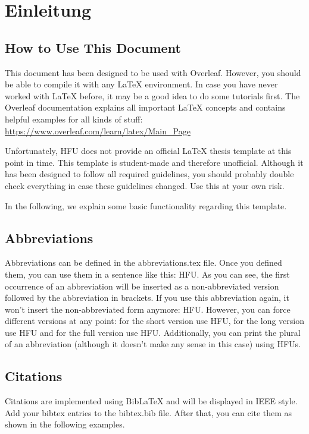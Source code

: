 \chapter{Einleitung}

\section{How to Use This Document}
This document has been designed to be used with Overleaf. However, you should be able to compile it with any LaTeX environment. In case you have never worked with LaTeX before, it may be a good idea to do some tutorials first. The Overleaf documentation explains all important LaTeX concepts and contains helpful examples for all kinds of stuff: \url{https://www.overleaf.com/learn/latex/Main_Page}\par

Unfortunately, \acl{HFU} does not provide an official LaTeX thesis template at this point in time. This template is student-made and therefore unofficial. Although it has been designed to follow all required guidelines, you should probably double check everything in case these guidelines changed. Use this at your own risk.\par

In the following, we explain some basic functionality regarding this template.

\section{Abbreviations}
Abbreviations can be defined in the abbreviations.tex file. Once you defined them, you can use them in a sentence like this: \ac{HFU}. As you can see, the first occurrence of an abbreviation will be inserted as a non-abbreviated version followed by the abbreviation in brackets. If you use this abbreviation again, it won't insert the non-abbreviated form anymore: \ac{HFU}. However, you can force different versions at any point: for the short version use \acs{HFU}, for the long version use \acl{HFU} and for the full version use \acf{HFU}. Additionally, you can print the plural of an abbreviation (although it doesn't make any sense in this case) using \acsp{HFU}. 

\section{Citations}
Citations are implemented using BibLaTeX and will be displayed in IEEE style. Add your bibtex entries to the bibtex.bib file. After that, you can cite them as shown in the following examples.

